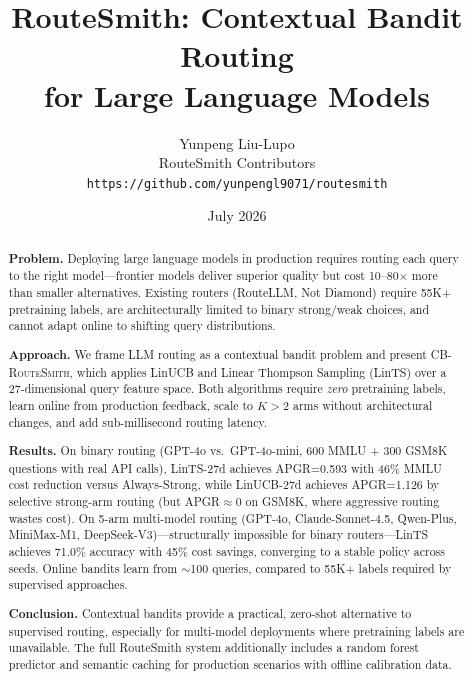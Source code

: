 \documentclass[11pt]{article}
\title{\Large \textbf{RouteSmith: Contextual Bandit Routing\\for Large Language Models}}
\author{Yunpeng Liu-Lupo\\[2pt]
\small RouteSmith Contributors\\[4pt]
\small \texttt{https://github.com/yunpengl9071/routesmith}}
\date{July 2026}
\newcommand{\cbroutesmith}{\textsc{CB-RouteSmith}}
\begin{document}
\maketitle

\begin{abstract}
\noindent \textbf{Problem.} Deploying large language models in production requires routing each query to the right model---frontier models deliver superior quality but cost 10--80$\times$ more than smaller alternatives. Existing routers (RouteLLM, Not Diamond) require 55K+ pretraining labels, are architecturally limited to binary strong/weak choices, and cannot adapt online to shifting query distributions.

\noindent \textbf{Approach.} We frame LLM routing as a contextual bandit problem and present \cbroutesmith{}, which applies LinUCB and Linear Thompson Sampling (LinTS) over a 27-dimensional query feature space. Both algorithms require \emph{zero} pretraining labels, learn online from production feedback, scale to $K>2$ arms without architectural changes, and add sub-millisecond routing latency.

\noindent \textbf{Results.} On binary routing (GPT-4o vs.\ GPT-4o-mini, 600 MMLU + 300 GSM8K questions with real API calls), LinTS-27d achieves APGR=0.593 with 46\% MMLU cost reduction versus Always-Strong, while LinUCB-27d achieves APGR=1.126 by selective strong-arm routing (but APGR$\approx$0 on GSM8K, where aggressive routing wastes cost). On 5-arm multi-model routing (GPT-4o, Claude-Sonnet-4.5, Qwen-Plus, MiniMax-M1, DeepSeek-V3)---structurally impossible for binary routers---LinTS achieves 71.0\% accuracy with 45\% cost savings, converging to a stable policy across seeds. Online bandits learn from $\sim$100 queries, compared to 55K+ labels required by supervised approaches.

\noindent \textbf{Conclusion.} Contextual bandits provide a practical, zero-shot alternative to supervised routing, especially for multi-model deployments where pretraining labels are unavailable. The full RouteSmith system additionally includes a random forest predictor and semantic caching for production scenarios with offline calibration data.
\end{abstract}

\end{document}
